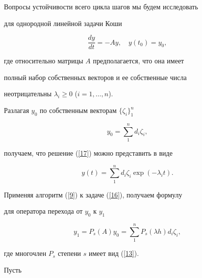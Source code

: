 Вопросы устойчивости всего цикла шагов мы будем исследовать


для однородной линейной задачи Коши


\begin{equation}


\frac{dy}{dt} = -Ay, \quad y(t_0)=y_0,


\label{16}


\end{equation}


где относительно матрицы $A$ предполагается, что она имеет


полный набор собственных векторов и ее собственные числа


неотрицательны $\lambda_i\ge 0$ ($i=1,\dotsc,n$).


Разлагая $y_0$ по собственным векторам $\{\zeta_i\}_1^n$


\begin{equation}


y_0 =\sum\limits_1^n d_i \zeta_i,


\label{17}


\end{equation}


получаем, что решение (\ref{17}) можно представить в виде


$$




y(t)= \sum_1^n d_i \zeta_i \exp(-\lambda_i t).






$$





Применяя алгоритм (\ref{9}) к задаче (\ref{16}), получаем формулу


для оператора перехода от $y_0$ к $y_1$


\begin{equation}


y_1=P_s(A)y_0 = \sum_1^n P_s(\lambda h) d_i \zeta_i,


\label{19}


\end{equation}


где многочлен $P_s$ степени $s$ имеет вид (\ref{13}).





Пусть



